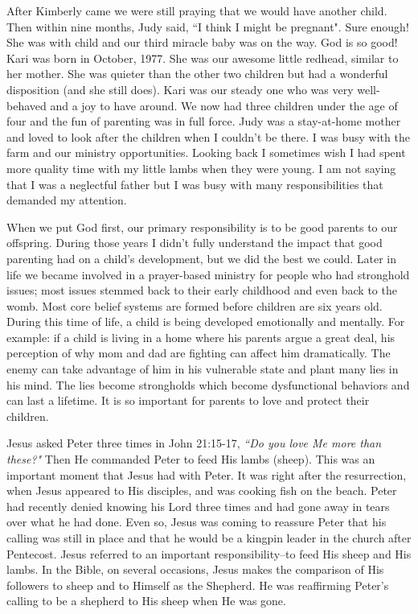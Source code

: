 \documentclass[oneside]{book}
\begin{document}
After Kimberly came we were still praying that we would have another child. Then within nine months, Judy said, ``I think I might be pregnant". Sure enough! She was with child and our third miracle baby was on the way. God is so good! Kari was born in October, 1977. She was our awesome little redhead, similar to her mother. She was quieter than the other two children but had a wonderful disposition (and she still does). Kari was our steady one who was very well-behaved and a joy to have around. We now had three children under the age of four and the fun of parenting was in full force. Judy was a stay-at-home mother and loved to look after the children when I couldn't be there. I was busy with the farm and our ministry opportunities. Looking back I sometimes wish I had spent more quality time with my little lambs when they were young. I am not saying that I was a neglectful father but I was busy with many responsibilities that demanded my attention.

When we put God first, our primary responsibility is to be good parents to our offspring. During those years I didn't fully understand the impact that good parenting had on a child's development, but we did the best we could. Later in life we became involved in a prayer-based ministry for people who had stronghold issues; most issues stemmed back to their early childhood and even back to the womb. Most core belief systems are formed before children are six years old. During this time of life, a child is being developed emotionally and mentally. For example: if a child is living in a home where his parents argue a great deal, his perception of why mom and dad are fighting can affect him dramatically. The enemy can take advantage of him in his vulnerable state and plant many lies in his mind. The lies become strongholds which become dysfunctional behaviors and can last a lifetime. It is so important for parents to love and protect their children.

Jesus asked Peter three times in John 21:15-17, \textit{``Do you love Me more than these?"} Then He commanded Peter to feed His lambs (sheep). This was an important moment that Jesus had with Peter. It was right after the resurrection, when Jesus appeared to His disciples, and was cooking fish on the beach. Peter had recently denied knowing his Lord three times and had gone away in tears over what he had done. Even so, Jesus was coming to reassure Peter that his calling was still in place and that he would be a kingpin leader in the church after Pentecost. Jesus referred to an important responsibility--to feed His sheep and His lambs. In the Bible, on several occasions, Jesus makes the comparison of His followers to sheep and to Himself as the Shepherd. He was reaffirming Peter's calling to be a shepherd to His sheep when He was gone.
\end{document}
